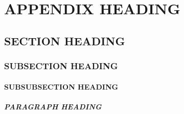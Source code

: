 \chapter{APPENDIX HEADING}
\label{chp:appendix}

\section{SECTION HEADING}

\subsection{SUBSECTION HEADING}

\subsubsection{SUBSUBSECTION HEADING}

\paragraph{PARAGRAPH HEADING}